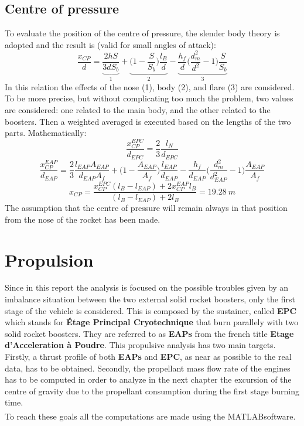 \documentclass[12pt,fleqn,openany]{book} %
\begin{document}
\section{Centre of pressure}
To evaluate the position of the centre of pressure, the slender body theory is adopted and the result is (valid for small angles of attack): 
\begin{equation}
 \frac{x_{CP}}{d}=\underbrace{\frac{2hS}{3dS_b}}_{\text{1}}+\underbrace{\Biggl(1-\frac{S}{S_b}\Biggr)\frac{l_B}{d}}_{\text{2}}-\underbrace{\frac{h_f}{d}\Biggl(\frac{d^2_m}{d^2}-1\Biggr)\frac{S}{S_b}}_{\text{3}}
\end{equation}
In this relation the effects of the nose (1), body (2), and flare (3) are considered. To be more precise, but without complicating too much the problem, two values are considered: one related to the main body, and the other related to the boosters. Then a weighted averaged is executed based on the lengths of the two parts. Mathematically: 
\begin{equation}
 \frac{x^{EPC}_{CP}}{d_{EPC}}=\frac{2}{3}\frac{l_N}{d_{EPC}}
\end{equation}
\begin{equation}
 \frac{x_{CP}^{EAP}}{d_{EAP}}=\frac{2}{3}\frac{l_{EAP}A_{EAP}}{d_{EAP}A_f}+\Biggl(1-\frac{A_{EAP}}{A_f}\Biggr)\frac{l_{EAP}}{d_{EAP}}-\frac{h_f}{d_{EAP}}\Biggl(\frac{d^2_m}{d^2_{EAP}}-1\Biggr)\frac{A_{EAP}}{A_f}
\end{equation}
\begin{equation}
 x_{CP}=\frac{x_{CP}^{EPC}(l_B-l_{EAP})+2x_{CP}^{EAP}l_B}{(l_B-l_{EAP})+2l_B}=\SI{19.28}{m}
\end{equation}
The assumption that the centre of pressure will remain always in that position from the nose of the rocket has been made. 


\chapter{Propulsion}
Since in this report the analysis is focused on the possible troubles given by an imbalance situation between the two external solid rocket boosters, only the first stage of the vehicle is considered. This is composed by the sustainer, called \textbf{EPC} which stands for \textbf{Étage Principal Cryotechnique} that burn parallely with two solid rocket boosters. They are referred to as \textbf{EAPs} from the french title \textbf{Etage d’Acceleration à Poudre}. This propulsive analysis has two main targets. Firstly, a thrust profile of both \textbf{EAPs} and \textbf{EPC}, as near as possible to the real data, has to be obtained. Secondly, the propellant mass flow rate of the engines has to be computed in order to analyze in the next chapter the excursion of the centre of gravity due to the propellant consumption during the first stage burning time.\\
To reach these goals all the computations are made using the MATLAB\textsuperscript\textregistered software. 
\end{document}
